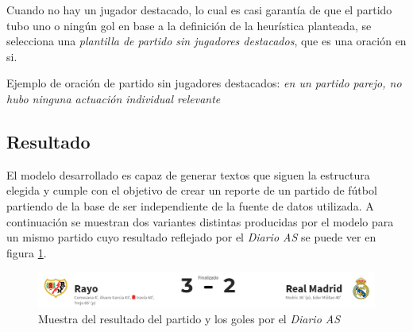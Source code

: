     Cuando no hay un jugador destacado, lo cual es casi garantía de que el partido tubo uno o ningún gol en base a la definición de la heurística planteada, se selecciona una 
    \textit{plantilla de partido sin jugadores destacados}, que es una oración en si.

    Ejemplo de oración de partido sin jugadores destacados: \textit{en un partido parejo, no hubo ninguna actuación individual relevante}


\subsection{Resultado}

    El modelo desarrollado es capaz de generar textos que siguen la estructura elegida y cumple con el objetivo de 
crear un reporte de un partido de fútbol partiendo de la base de ser independiente de la fuente de datos utilizada. 
A continuación se muestran  dos variantes distintas producidas por el modelo para un mismo partido cuyo resultado reflejado por el 
\textit{Diario AS} se puede ver en figura \ref{fig_rayomadrid}.
\\

\begin{figure}[!]
    \begin{center}
        \includegraphics[scale=0.4]{Graphics/rayomadrid.png}
    \end{center}
    \caption{Muestra del resultado del partido y los goles por el \textit{Diario AS}}
    \label{fig_rayomadrid}
\end{figure}

